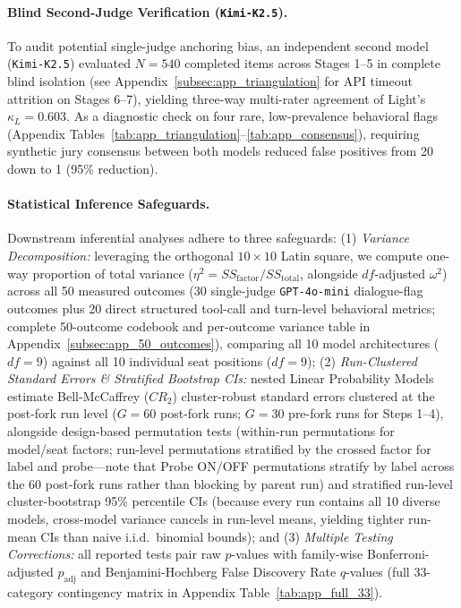 \paragraph{Blind Second-Judge Verification (\texttt{Kimi-K2.5}).}
To audit potential single-judge anchoring bias, an independent second model (\texttt{Kimi-K2.5}) evaluated $N = 540$ completed items across Stages 1--5 in complete blind isolation (see Appendix~\ref{subsec:app_triangulation} for API timeout attrition on Stages 6--7), yielding three-way multi-rater agreement of Light's $\kappa_L = 0.603$. As a diagnostic check on four rare, low-prevalence behavioral flags (Appendix Tables~\ref{tab:app_triangulation}--\ref{tab:app_consensus}), requiring synthetic jury consensus between both models reduced false positives from 20 down to 1 (95\% reduction).

\paragraph{Statistical Inference Safeguards.}
Downstream inferential analyses adhere to three safeguards: (1) \emph{Variance Decomposition:} leveraging the orthogonal $10 \times 10$ Latin square, we compute one-way proportion of total variance ($\eta^2 = SS_{\text{factor}} / SS_{\text{total}}$, alongside $df$-adjusted $\omega^2$) across all 50 measured outcomes (30 single-judge \texttt{GPT-4o-mini} dialogue-flag outcomes plus 20 direct structured tool-call and turn-level behavioral metrics; complete 50-outcome codebook and per-outcome variance table in Appendix~\ref{subsec:app_50_outcomes}), comparing all 10 model architectures ($df = 9$) against all 10 individual seat positions ($df = 9$); (2) \emph{Run-Clustered Standard Errors \& Stratified Bootstrap CIs:} nested Linear Probability Models estimate Bell-McCaffrey ($CR_2$) cluster-robust standard errors clustered at the post-fork run level ($G = 60$ post-fork runs; $G = 30$ pre-fork runs for Steps 1--4), alongside design-based permutation tests (within-run permutations for model/seat factors; run-level permutations stratified by the crossed factor for label and probe---note that Probe ON/OFF permutations stratify by label across the 60 post-fork runs rather than blocking by parent run) and stratified run-level cluster-bootstrap 95\% percentile CIs (because every run contains all 10 diverse models, cross-model variance cancels in run-level means, yielding tighter run-mean CIs than naive i.i.d.\ binomial bounds); and (3) \emph{Multiple Testing Corrections:} all reported tests pair raw $p$-values with family-wise Bonferroni-adjusted $p_{\text{adj}}$ and Benjamini-Hochberg False Discovery Rate $q$-values (full 33-category contingency matrix in Appendix Table~\ref{tab:app_full_33}).
